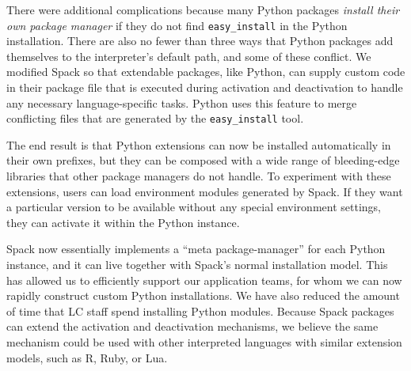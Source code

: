 There were additional complications because many Python packages {\it install their own
package manager} if they do not find {\tt easy\_install} in the Python installation.
There are also no fewer than three ways that Python packages add themselves to the
interpreter's default path, and some of these conflict. We modified Spack so that 
extendable packages, like Python, can supply custom code in their package file that is
executed during activation and deactivation to handle any necessary language-specific tasks.
Python uses this feature to merge conflicting files that are generated by the {\tt easy\_install} tool.

The end result is that Python extensions can now be installed automatically
in their own prefixes, but they can be composed with a wide range
of bleeding-edge libraries that other package managers do not handle.  To experiment
with these extensions, users can load environment modules generated by Spack.
If they want a particular version to be available without any special environment 
settings, they can activate it within the Python instance.

Spack now essentially implements a ``meta package-manager'' for each Python
instance, and it can live together with Spack's normal installation model.
This has allowed us to efficiently support our application teams, for whom we can
now rapidly construct custom Python installations.  We have also reduced
the amount of time that LC staff spend installing Python modules.
Because Spack packages can extend the activation and deactivation mechanisms,
we believe the same mechanism could be used with other 
interpreted languages with similar extension models, such as R, Ruby, or Lua.

